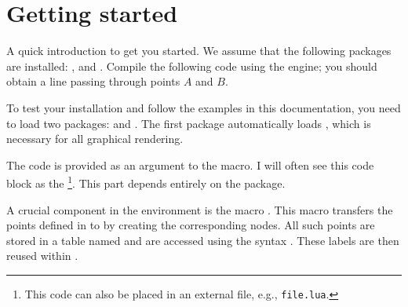 \section{Getting started} %
\label{sec:getting_started}

A quick introduction to get you started. We assume that the following packages are installed:  , and .
Compile the following code using the  engine; you should obtain a line passing through points $A$ and $B$.

\begin{minipage}{.6\textwidth}
\end{minipage}
\begin{minipage}{.4\textwidth}
\end{minipage}

To test your installation and follow the examples in this documentation, you need to load two packages:  and . The first package automatically loads \tkzNamePack{\TIKZ}, which is necessary for all graphical rendering.


The  code is provided as an argument to the  macro. I will often see  this code block as the \footnote{This code can also be placed in an external file, e.g., \texttt{file.lua}.}. This part depends entirely on the  package.

A crucial component in the  environment is the macro . This macro transfers the points defined in  to \tkzNamePack{\TIKZ} by creating the corresponding nodes. All such points are stored in a table named  and are accessed using the syntax . These labels are then reused within .

